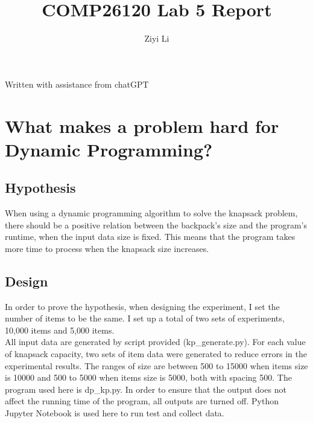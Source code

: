 \documentclass[a4]{article}
\title{COMP26120 Lab 5 Report}
\author{Ziyi Li}
\begin{document}
\maketitle
Written with assistance from chatGPT

\section{What makes a problem hard for Dynamic Programming?}

\subsection{Hypothesis}

When using a dynamic programming algorithm to solve the knapsack problem, there should be a positive relation between the backpack's size and the program's runtime, when the input data size is fixed. This means that the program takes more time to process when the knapsack size increases.

\subsection{Design}

In order to prove the hypothesis, when designing the experiment, I set the number of items to be the same. I set up a total of two sets of experiments, 10,000 items and 5,000 items. \\

\noindent All input data are generated by script provided (kp\_generate.py). For each value of knapsack capacity, two sets of item data were generated to reduce errors in the experimental results. The ranges of size are between 500 to 15000 when items size is 10000 and 500 to 5000 when items size is 5000, both with spacing 500. The program used here is dp\_kp.py. In order to ensure that the output does not affect the running time of the program, all outputs are turned off. Python Jupyter Notebook is used here to run test and collect data.
\end{document}

